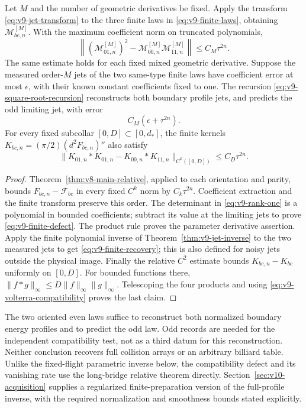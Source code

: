 \begin{corollary}
\label{cor:v9-finite-records}
Let $M$ and the number of geometric derivatives be fixed. Apply the
transform \eqref{eq:v9-jet-transform} to the three finite laws in
\eqref{eq:v9-finite-laws}, obtaining $\mathcal M_{bc,n}^{[M]}$.
With the maximum coefficient norm on truncated polynomials,
\begin{equation}\label{eq:v9-finite-defect}
 \left\|(\mathcal M_{01,n}^{[M]})^2
         -\mathcal M_{00,n}^{[M]}\mathcal M_{11,n}^{[M]}\right\|
                                       \le C_M\tau^{2n}.
\end{equation}
The same estimate holds for each fixed mixed geometric derivative.
Suppose the measured order-$M$ jets of the two same-type finite laws
have coefficient error at most $\epsilon$, with their known constant
coefficients fixed to one. The recursion
\eqref{eq:v9-square-root-recursion} reconstructs both boundary profile
jets, and predicts the odd limiting jet, with error
\begin{equation}\label{eq:v9-finite-recovery}
                           C_M(\epsilon+\tau^{2n}).
\end{equation}
For every fixed subcollar $[0,D]\subset[0,d_*]$, the finite kernels
$K_{bc,n}=(\pi/2)(d^2F_{bc,n})''$ also satisfy
\[
 \|K_{01,n}*K_{01,n}-K_{00,n}*K_{11,n}\|_{C^0([0,D])}
                                     \le C_D\tau^{2n}.
\]
\end{corollary}
\begin{proof}
Theorem~\ref{thm:v8-main-relative}, applied to each orientation and
parity, bounds $F_{bc,n}-\mathcal F_{bc}$ in every fixed $C^k$
norm by $C_k\tau^{2n}$. Coefficient extraction and the finite
transform preserve this order. The determinant in
\eqref{eq:v9-rank-one} is a polynomial in bounded coefficients;
subtract its value at the limiting jets to prove
\eqref{eq:v9-finite-defect}. The product rule proves the parameter
derivative assertion. Apply the finite polynomial inverse of
Theorem~\ref{thm:v9-jet-inverse} to the two measured jets to get
\eqref{eq:v9-finite-recovery}; this is also defined for noisy jets
outside the physical image. Finally the relative $C^2$ estimate
bounds $K_{bc,n}-K_{bc}$ uniformly on $[0,D]$. For bounded
functions there, $\|f*g\|_\infty\le D\|f\|_\infty\|g\|_\infty$.
Telescoping the four products and using
\eqref{eq:v9-volterra-compatibility} proves the last claim.
\end{proof}

The two oriented even laws suffice to reconstruct both normalized
boundary energy profiles and to predict the odd law. Odd records are
needed for the independent compatibility test, not as a third datum
for this reconstruction. Neither conclusion recovers full collision
arrays or an arbitrary billiard table. Unlike the fixed-flight
parametric inverse below, the compatibility defect and its vanishing
rate use the long-bridge relative theorem directly.
Section~\ref{sec:v10-acquisition} supplies a regularized finite-preparation
version of the full-profile inverse, with the required normalization
and smoothness bounds stated explicitly.
